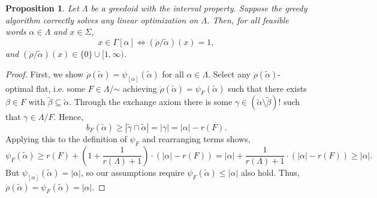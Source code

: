 \documentclass[11pt]{article}
\newtheorem{proposition}[theorem]{Proposition}
\newcommand{\univ}{\Sigma}
\newcommand{\glang}{\Lambda}
\newcommand{\greedyrep}{\ddot{\rho}}
\begin{document}
\begin{proposition}\label{prop:greedy-aligned-rep}
    Let $\glang$ be a greedoid with the interval property.
    Suppose the greedy algorithm correctly solves any linear optimization on $\glang$.
    Then, for all feasible words $\alpha \in \glang$ and $x\in\univ$,
    \[
        x \in \Gamma[\alpha] \iff \left(\greedyrep/\widetilde{\alpha}\right)(x) = 1,
    \]
    and $\left(\greedyrep/\widetilde{\alpha}\right)(x) \in \{0\}\cup[1,\infty)$. 
\end{proposition}
\begin{proof}
    First, we show $\greedyrep(\widetilde{\alpha}) = \psi_{[\alpha]}(\widetilde{\alpha})$ for all $\alpha \in \glang$.
    Select any $\greedyrep(\widetilde{\alpha})$-optimal flat, i.e. some $F\in\glang/\mathord{\sim}$ achieving $\greedyrep(\widetilde{\alpha}) = \psi_F(\widetilde{\alpha})$ such that there exists $\beta \in F$ with $\widetilde{\beta}\subseteq\widetilde{\alpha}$.
    Through the exchange axiom there is some $\gamma \in (\widetilde{\alpha}\setminus\widetilde{\beta})!$ such that $\gamma\in\glang/F$.
    Hence,
    $$b_F(\widetilde{\alpha})\geq|\widetilde{\gamma}\cap\widetilde{\alpha}| = |\gamma| = |\alpha| - r(F).$$
    Applying this to the definition of $\psi_F$ and rearranging terms shows,
    $$\psi_{F}(\widetilde{\alpha}) \geq r(F) + \left(1+\frac{1}{r(\glang) + 1}\right)\cdot\left(|\alpha| - r(F)\right) = |\alpha| + \frac{1}{r(\glang) + 1}\cdot\left(|\alpha| - r(F)\right)\geq |\alpha|.$$
    But $\psi_{[\alpha]}(\widetilde{\alpha}) = |\alpha|$, so our assumptions require $\psi_F(\widetilde{\alpha}) \leq |\alpha|$ also hold.
    Thus, $\greedyrep(\widetilde{\alpha}) = \psi_{F}(\widetilde{\alpha}) = |\alpha|$.


\end{proof}
\end{document}
